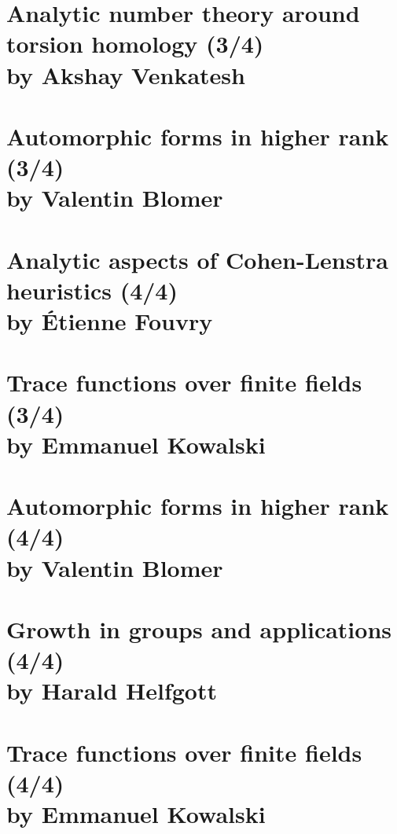 \documentclass[12pt,amsfont]{amsart}
\begin{document}
\section{Analytic number theory around torsion homology (3/4) \\by Akshay Venkatesh}\label{33}

\newpage
\renewcommand{\thesubsection}{\arabic{section}.\arabic{subsection}}
\section{Automorphic forms in higher rank (3/4)
\\ by Valentin Blomer}\label{4}

\newpage
\renewcommand{\thesubsection}{\arabic{section}.\arabic{subsection}}
\section{Analytic aspects of Cohen-Lenstra heuristics (4/4)
\\ by \'{E}tienne Fouvry}\label{5}

\newpage
\section{Trace functions over finite fields
 (3/4)\\ by Emmanuel Kowalski}\label{1}

\begingroup
\renewcommand{\addcontentsline}[3]{}%
\endgroup


\newpage
\renewcommand{\thesubsection}{\arabic{section}.\arabic{subsection}}
\section{Automorphic forms in higher rank (4/4)
\\ by Valentin Blomer}\label{2}

\newpage
\renewcommand{\thesubsection}{\arabic{section}.\arabic{subsection}}
\section{Growth in groups and applications (4/4)
\\ by Harald Helfgott}\label{3}

\newpage
\renewcommand{\thesubsection}{\arabic{section}.\arabic{subsection}}
\section{Trace functions over finite fields
 (4/4)\\ by Emmanuel Kowalski}\label{4}
\end{document}
